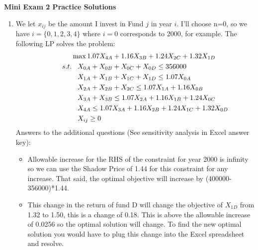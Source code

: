 \documentclass{article}[11 pt]    %
\begin{document}
\begin{center}
\textbf{Mini Exam 2 Practice Solutions}\\[.1cm]
\end{center}

\begin{enumerate}
\item We let $x_{ij}$ be the amount I invest in Fund $j$ in year $i$.  I'll choose n=0, so we have $i=\{0,1,2,3,4\}$ where $i=0$ corresponds to 2000, for example.  The following LP solves the problem:
\begin{align*}
\hspace{1.5cm}& \max 1.07X_{4A} + 1.16X_{3B} + 1.24X_{2C} + 1.32X_{1D} \\
s.t. &\;\;\; X_{0A}+X_{0B}+X_{0C} + X_{0D} \leq 356000\\
&\;\;\; X_{1A}+X_{1B}+X_{1C} + X_{1D} \leq 1.07X_{0A} \\
&\;\;\; X_{2A}+X_{2B}+X_{2C}  \leq 1.07X_{1A} + 1.16X_{0B} \\
&\;\;\; X_{3A}+X_{3B} \leq 1.07X_{2A} + 1.16X_{1B} + 1.24X_{0C} \\
&\;\;\; X_{4A} \leq 1.07X_{3A} + 1.16X_{2B} + 1.24X_{1C} + 1.32X_{0D}  \\
&\;\;\; X_{ij} \geq 0
\end{align*}
\noindent Answers to the additional questions (See sensitivity analysis in Excel answer key):
\begin{itemize}
\item Allowable increase for the RHS of the constraint for year 2000 is infinity so we can use the Shadow Price of 1.44 for this constraint for any increase.  That said, the optimal objective will increase by (400000-356000)*1.44.
\item This change in the return of fund D will change the objective of $X_{1D}$ from 1.32 to 1.50, this is a change of 0.18. This is above the allowable increase of 0.0256 so the optimal solution will change.   To find the new optimal solution you would have to plug this change into the Excel spreadsheet and resolve.
\end{itemize}


\end{enumerate}
\end{document}
